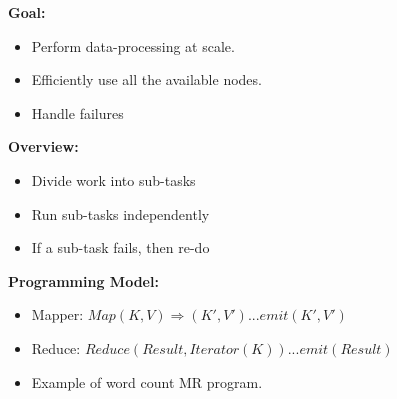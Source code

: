 \documentclass[parskip=half]{scrartcl}
\begin{document}
    \textbf{Goal:}
    \begin{itemize}
        \item 
        Perform data-processing at scale.
        \item 
        Efficiently use all the available nodes.
        \item 
        Handle failures
    \end{itemize}

    \textbf{Overview:}
    \begin{itemize}
        \item 
        Divide work into sub-tasks
        \item 
        Run sub-tasks independently
        \item 
        If a sub-task fails, then re-do
    \end{itemize}

    \textbf{Programming Model:}
    \begin{itemize}
        \item 
        Mapper: $Map(K,V) \Rightarrow (K\prime, V\prime) ... emit(K\prime, V\prime)$
        \item 
        Reduce: $Reduce(Result, Iterator(K)) ... emit(Result)$
        \item 
        Example of word count MR program.
    \end{itemize}
\end{document}
